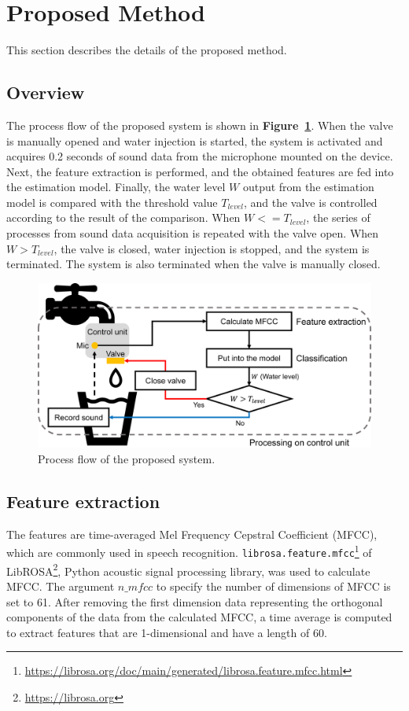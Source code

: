 \documentclass[sigconf]{acmart}
\newcommand\figref[1]{\textbf{Figure~\ref{fig:#1}}}
\begin{document}
\section{Proposed Method}
\label{sec:method}
This section describes the details of the proposed method.

\subsection{Overview}
The process flow of the proposed system is shown in \figref{method}. When the valve is manually opened and water injection is started, the system is activated and acquires 0.2 seconds of sound data from the microphone mounted on the device. Next, the feature extraction is performed, and the obtained features are fed into the estimation model. Finally, the water level $W$ output from the estimation model is compared with the threshold value $T_{level}$, and the valve is controlled according to the result of the comparison. When $W<=T_{level}$, the series of processes from sound data acquisition is repeated with the valve open. When $W>T_{level}$, the valve is closed, water injection is stopped, and the system is terminated. The system is also terminated when the valve is manually closed.

\begin{figure}[!t]
  \centering
  \includegraphics[width=1\linewidth]{figures/method.eps}
  \caption{Process flow of the proposed system.}
  \label{fig:method}
\end{figure}


\subsection{Feature extraction}
The features are time-averaged Mel Frequency Cepstral Coefficient (MFCC), which are commonly used in speech recognition. \texttt{librosa.feature.mfcc}\footnote{\url{https://librosa.org/doc/main/generated/librosa.feature.mfcc.html}} of LibROSA\footnote{\url{https://librosa.org}}, Python acoustic signal processing library, was used to calculate MFCC. The argument $n\_mfcc$ to specify the number of dimensions of MFCC is set to 61. After removing the first dimension data representing the orthogonal components of the data from the calculated MFCC, a time average is computed to extract features that are 1-dimensional and have a length of 60.
\end{document}
